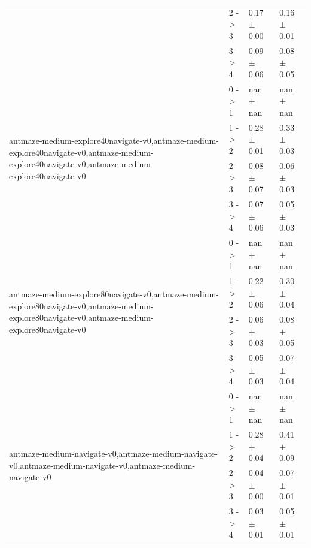 \begin{tabular}{llll}
 & 2 -> 3 & 0.17 $\pm$ 0.00 & 0.16 $\pm$ 0.01 \\
 & 3 -> 4 & 0.09 $\pm$ 0.06 & 0.08 $\pm$ 0.05 \\
\cline{1-4}
\multirow[t]{4}{*}{antmaze-medium-explore40navigate-v0,antmaze-medium-explore40navigate-v0,antmaze-medium-explore40navigate-v0,antmaze-medium-explore40navigate-v0} & 0 -> 1 & nan $\pm$ nan & nan $\pm$ nan \\
 & 1 -> 2 & 0.28 $\pm$ 0.01 & 0.33 $\pm$ 0.03 \\
 & 2 -> 3 & 0.08 $\pm$ 0.07 & 0.06 $\pm$ 0.03 \\
 & 3 -> 4 & 0.07 $\pm$ 0.06 & 0.05 $\pm$ 0.03 \\
\cline{1-4}
\multirow[t]{4}{*}{antmaze-medium-explore80navigate-v0,antmaze-medium-explore80navigate-v0,antmaze-medium-explore80navigate-v0,antmaze-medium-explore80navigate-v0} & 0 -> 1 & nan $\pm$ nan & nan $\pm$ nan \\
 & 1 -> 2 & 0.22 $\pm$ 0.06 & 0.30 $\pm$ 0.04 \\
 & 2 -> 3 & 0.06 $\pm$ 0.03 & 0.08 $\pm$ 0.05 \\
 & 3 -> 4 & 0.05 $\pm$ 0.03 & 0.07 $\pm$ 0.04 \\
\cline{1-4}
\multirow[t]{4}{*}{antmaze-medium-navigate-v0,antmaze-medium-navigate-v0,antmaze-medium-navigate-v0,antmaze-medium-navigate-v0} & 0 -> 1 & nan $\pm$ nan & nan $\pm$ nan \\
 & 1 -> 2 & 0.28 $\pm$ 0.04 & 0.41 $\pm$ 0.09 \\
 & 2 -> 3 & 0.04 $\pm$ 0.00 & 0.07 $\pm$ 0.01 \\
 & 3 -> 4 & 0.03 $\pm$ 0.01 & 0.05 $\pm$ 0.01 \\
\cline{1-4}
\bottomrule
\end{tabular}
